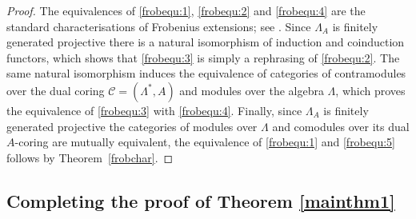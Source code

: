 \documentclass[12pt,a4paper]{amsart}
\theoremstyle{plain}
\theoremstyle{definition}
\numberwithin{equation}{thm}
\begin{document}
\begin{proof}
The equivalences of \eqref{frobequ:1}, \eqref{frobequ:2} and \eqref{frobequ:4} are the standard characterisations of Frobenius extensions; see \cite{Mor65}. Since $\Lambda_A$ is finitely generated projective there is a natural isomorphism of induction and coinduction functors, which shows that \eqref{frobequ:3} is simply a rephrasing of \eqref{frobequ:2}. The same natural isomorphism induces the equivalence of categories of contramodules over the dual coring $\mathcal{C} = (\Lambda^*, A)$ and modules over the algebra $\Lambda$, which proves the equivalence of \eqref{frobequ:3} with \eqref{frobequ:4}. Finally, since $\Lambda_A$ is finitely generated projective the categories of modules over $\Lambda$ and comodules over its dual $A$-coring are mutually equivalent, the equivalence of \eqref{frobequ:1} and \eqref{frobequ:5} follows by Theorem~\ref{frobchar}.
\end{proof}


\subsection{Completing the proof of Theorem \ref{mainthm1}}
\end{document}
